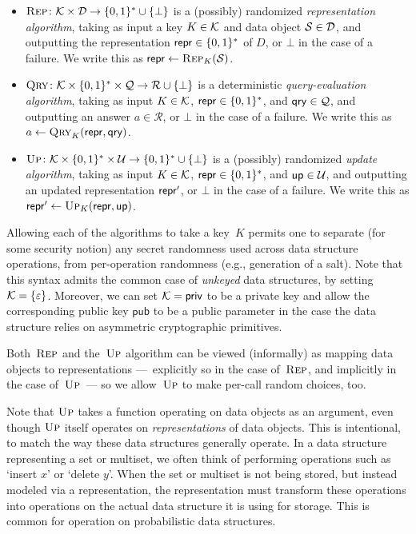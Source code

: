 \begin{itemize}[leftmargin=.2in]
  \item $\textnormal{\textsc{Rep}}\colon \mathcal{K} \times \mathcal{D} \to \{0,1\}^* \cup \{\bot\}$ is a
  (possibly) randomized {\em representation algorithm}, taking as input a key $K \in
  \mathcal{K}$ and data object $\mathcal{S} \in \mathcal{D}$, and outputting the
  representation $\mathsf{repr} \in \{0,1\}^*$ of $D$, or $\bot$ in the case of a
  failure. We write this as $\mathsf{repr} \gets \textnormal{\textsc{Rep}}_K(\mathcal{S})$.
%
  \item $\textnormal{\textsc{Qry}}\colon \mathcal{K} \times \{0,1\}^* \times \mathcal{Q} \to \mathcal{R} \cup \{\bot\}$
  is a deterministic {\em query-evaluation algorithm}, taking as input $K \in
  \mathcal{K}$, $\mathsf{repr} \in \{0,1\}^*$, and $\mathsf{qry} \in \mathcal{Q}$, and outputting an
  answer $a \in \mathcal{R}$, or $\bot$ in the case of a failure. We write this as $a \gets \textnormal{\textsc{Qry}}_K(\mathsf{repr},\mathsf{qry})$.
%
  \item $\textnormal{\textsc{Up}}\colon \mathcal{K} \times \{0,1\}^* \times \mathcal{U} \to \{0,1\}^* \cup
  \{\bot\}$ is a (possibly) randomized {\em update algorithm}, taking as input $K \in
  \mathcal{K}$, $\mathsf{repr} \in \{0,1\}^*$, and $\mathsf{up} \in \mathcal{U}$, and outputting an
  updated representation $\mathsf{repr}'$, or $\bot$ in the case of a failure. We write
  this as $\mathsf{repr}' \gets \textnormal{\textsc{Up}}_K(\mathsf{repr},\mathsf{up})$.
\end{itemize}

Allowing each of the algorithms to take a key~$K$ permits one to separate (for some
security notion) any secret randomness used across data structure operations,
from per-operation randomness (e.g., generation of a salt). Note that this syntax admits the
common case of \emph{unkeyed} data structures, by setting
$\mathcal{K}=\{\varepsilon\}$. Moreover, we can set $\mathcal{K}=\mathsf{priv}$ to be a private key and allow the corresponding public key $\mathsf{pub}$ to be a public parameter in the case the data structure relies on asymmetric cryptographic primitives.  

Both~$\textnormal{\textsc{Rep}}$ and the~$\textnormal{\textsc{Up}}$ algorithm can be viewed (informally) as mapping data
objects to representations ---~explicitly so in the case of~$\textnormal{\textsc{Rep}}$, and
implicitly in the case of~$\textnormal{\textsc{Up}}$~--- so we allow~$\textnormal{\textsc{Up}}$ to make per-call random
choices, too. 

Note that $\textnormal{\textsc{Up}}$ takes a function operating on data objects as an argument, even
though $\textnormal{\textsc{Up}}$ itself operates on \emph{representations} of data objects. This is
intentional, to match the way these data structures generally operate.
In a data structure representing a set or multiset, we often think of performing
operations such as `insert $x$' or `delete $y$'. When the set or multiset is not
being stored, but instead modeled via a representation, the representation must
transform these operations into operations on the actual data structure it is
using for storage. This is common for operation on probabilistic data structures. 

